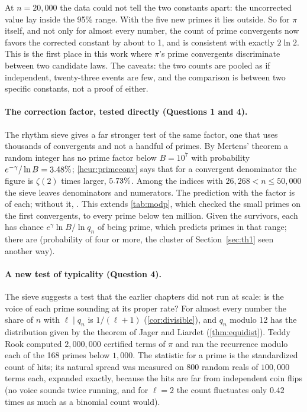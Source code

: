 At $n = 20{,}000$ the data could not tell the two constants apart: the uncorrected value \RaNaiveC{} lay inside the 95\% range. With the five new primes it lies outside. So for $\pi$ itself, and not only for almost every number, the count of prime convergents now favors the corrected constant by about \RaFiLR{} to 1, and is consistent with exactly $2\ln 2$. This is the first place in this work where $\pi$'s prime convergents discriminate between two candidate laws. The caveats: the two counts are pooled as if independent, twenty-three events are few, and the comparison is between two specific constants, not a proof of either.

\paragraph{The correction factor, tested directly (Questions 1 and 4).} The rhythm sieve gives a far stronger test of the same factor, one that uses thousands of convergents and not a handful of primes. By Mertens' theorem a random integer has no prime factor below $B = 10^7$ with probability $e^{-\gamma}/\ln B = 3.48\%$; \cref{heur:primeconv} says that for a convergent denominator the figure is $\zeta(2)$ times larger, $5.73\%$. Among the \RaCand{} indices with $26{,}268 < n \le 50{,}000$ the sieve leaves \RaSurvQ{} denominators and \RaSurvP{} numerators. The prediction with the factor is \RaPredZ{} of each; without it, \RaPredNaive. This extends \cref{tab:modp}, which checked the small primes on the first \NT{} convergents, to every prime below ten million. Given the survivors, each has chance $e^{\gamma}\ln B/\ln q_n$ of being prime, which predicts \RaAmongExp{} primes in that range; there are \RaAmongFound{} (probability \RaAmongP{} of four or more, the cluster of Section~\ref{sec:th1} seen another way).

\paragraph{A new test of typicality (Question 4).} The sieve suggests a test that the earlier chapters did not run at scale: is the voice of each prime sounding at its proper rate? For almost every number the share of $n$ with $\ell \mid q_n$ is $1/(\ell + 1)$ (\cref{cor:divisible}), and $q_n$ modulo 12 has the distribution given by the theorem of Jager and Liardet (\cref{thm:equidist}). Teddy Rook computed $2{,}000{,}000$ certified terms of $\pi$ and ran the recurrence modulo each of the 168 primes below $1{,}000$. The statistic for a prime is the standardized count of hits; its natural spread was measured on 800 random reals of $100{,}000$ terms each, expanded exactly, because the hits are far from independent coin flips (no voice sounds twice running, and for $\ell = 2$ the count fluctuates only $0.42$ times as much as a binomial count would).

